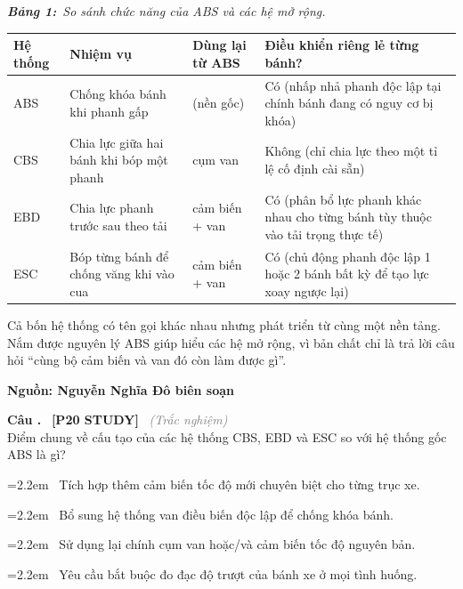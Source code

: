 \documentclass[12pt,a4paper,twoside]{article}
\newcounter{qcounter}
\newcommand{\question}[2][]{%
    \stepcounter{qcounter}%
    \par\vspace{5pt}%
    \noindent\textcolor{primaryBlue}{\textbf{Câu \theqcounter.}}~%
    \textcolor{secondaryBlue}{\small\textbf{[P20 STUDY]}}~%
    \if\relax\detokenize{#1}\relax\else\textcolor{gray}{\small\textit{(#1)}}~\fi\\[1pt]
    \noindent #2%
}
\newcommand{\choiceitem}[2]{%
    \tikz[baseline=-0.5ex]{
        \node[draw=primaryBlue, circle, minimum size=1.5em, inner sep=0pt, thick] {\textbf{#1}};
    }~#2%
}
\newcommand{\tablecaption}[2]{%
    \par\vspace{2pt}%
    {\centering\textbf{\textit{Bảng #1:}}~\textit{#2}\par}%
    \vspace{0pt}%
}
\newenvironment{readingpassage}[1][]{%
    \begin{tcolorbox}[enhanced, colback=grayLight, colframe=secondaryBlue,
        coltitle=textDark, fonttitle=\bfseries, title={#1},
        rounded corners, arc=3mm, boxrule=1pt,
        left=15pt, right=15pt, top=10pt, bottom=10pt,
        breakable, before skip=10pt, after skip=10pt, drop fuzzy shadow]
    \setstretch{1.3}
}{\end{tcolorbox}}
\begin{document}
\begin{readingpassage}[]
\tablecaption{1}{So sánh chức năng của ABS và các hệ mở rộng.}
%
\begin{center}
\begin{tabular}{|>{\raggedright\arraybackslash}m{1.2cm}|>{\raggedright\arraybackslash}m{3.8cm}|>{\raggedright\arraybackslash}m{2cm}|>{\raggedright\arraybackslash}m{5.5cm}|}
\hline
\rowcolor{primaryBlue!12}
\textbf{Hệ thống} & \textbf{Nhiệm vụ} & \textbf{Dùng lại từ ABS} & \textbf{Điều khiển riêng lẻ từng bánh?} \\
\hline
ABS & Chống khóa bánh khi phanh gấp & (nền gốc) & Có (nhấp nhả phanh độc lập tại chính bánh đang có nguy cơ bị khóa) \\
\hline
CBS & Chia lực giữa hai bánh khi bóp một phanh & cụm van & Không (chỉ chia lực theo một tỉ lệ cố định cài sẵn) \\
\hline
EBD & Chia lực phanh trước sau theo tải & cảm biến + van & Có (phân bổ lực phanh khác nhau cho từng bánh tùy thuộc vào tải trọng thực tế) \\
\hline
ESC & Bóp từng bánh để chống văng khi vào cua & cảm biến + van & Có (chủ động phanh độc lập 1 hoặc 2 bánh bất kỳ để tạo lực xoay ngược lại) \\
\hline
\end{tabular}
\end{center}

Cả bốn hệ thống có tên gọi khác nhau nhưng phát triển từ cùng một nền tảng. Nắm được nguyên lý ABS giúp hiểu các hệ mở rộng, vì bản chất chỉ là trả lời câu hỏi ``cùng bộ cảm biến và van đó còn làm được gì''.

\hfill\textbf{Nguồn: Nguyễn Nghĩa Đô biên soạn}
\end{readingpassage}
\vspace{2pt}
\question[Trắc nghiệm]{Điểm chung về cấu tạo của các hệ thống CBS, EBD và ESC so với hệ thống gốc ABS là gì?}
\par\vspace{4pt}
\noindent\hangindent=2.2em\choiceitem{A}{Tích hợp thêm cảm biến tốc độ mới chuyên biệt cho từng trục xe.}\par\vspace{4pt}
\noindent\hangindent=2.2em\choiceitem{B}{Bổ sung hệ thống van điều biến độc lập để chống khóa bánh.}\par\vspace{4pt}
\noindent\hangindent=2.2em\choiceitem{C}{Sử dụng lại chính cụm van hoặc/và cảm biến tốc độ nguyên bản.}\par\vspace{4pt}
\noindent\hangindent=2.2em\choiceitem{D}{Yêu cầu bắt buộc đo đạc độ trượt của bánh xe ở mọi tình huống.}\par\vspace{4pt}
\end{document}
